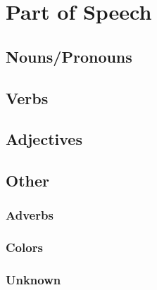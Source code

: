 \chapter{Part of Speech}
\section{Nouns/Pronouns}
\section{Verbs}
\section{Adjectives}
\section{Other}
\subsection{Adverbs}
\subsection{Colors}
\subsection{Unknown}